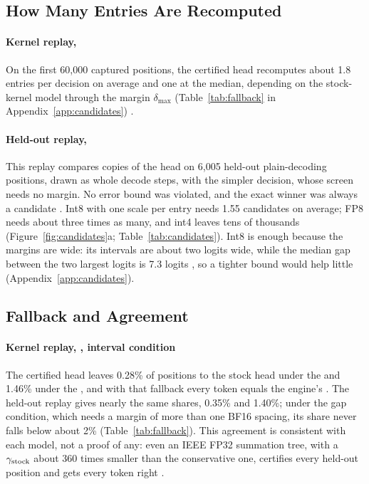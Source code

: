 \subsection{How Many Entries Are Recomputed}\label{sec:geometry-selfevidence}\label{sec:candidates}
\paragraph{Kernel replay, \Rstock{}} On the first 60,000 captured positions, the certified head recomputes about 1.8 entries per decision on average and one at the median, depending on the stock-kernel model through the margin $\delta_{\max}$ (Table~\ref{tab:fallback} in Appendix~\ref{app:candidates}) .

\paragraph{Held-out replay, \Rreal{}} This replay compares copies of the head on 6,005 held-out plain-decoding positions, drawn as whole decode steps, with the simpler \Rreal{} decision, whose screen needs no margin. No error bound was violated, and the exact winner was always a candidate . Int8 with one scale per entry needs 1.55 candidates on average; FP8 needs about three times as many, and int4 leaves tens of thousands (Figure~\ref{fig:candidates}a; Table~\ref{tab:candidates}). Int8 is enough because the margins are wide: its intervals are about two logits wide, while the median gap between the two largest logits is 7.3 logits , so a tighter bound would help little (Appendix~\ref{app:candidates}).

\subsection{Fallback and Agreement}\label{sec:rstock-share}
\paragraph{Kernel replay, \Rstock{}, interval condition} The certified head leaves 0.28\% of positions to the stock head under the \modelhopper{} and 1.46\% under the \modelcons, and with that fallback every token equals the engine's . The held-out replay gives nearly the same shares, 0.35\% and 1.40\%; under the gap condition, which needs a margin of more than one BF16 spacing, its share never falls below about 2\% (Table~\ref{tab:fallback}). This agreement is consistent with each model, not a proof of any: even an IEEE FP32 summation tree, with a $\gamma_{\rm stock}$ about 360 times smaller than the conservative one, certifies every held-out position and gets every token right .

